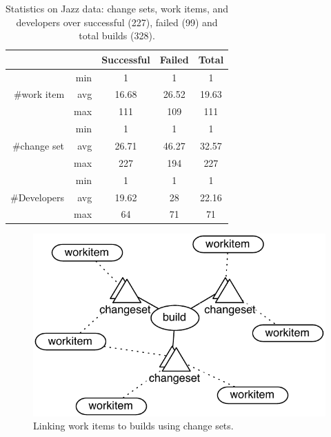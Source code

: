\documentclass[12pt,oneside]{book}
\begin{document}
\begin{table}[t]
\centering
\begin{tabular}{rrccc}
\toprule
& & Successful & Failed & Total\\
\midrule
&min &1&1&1\\
\#work item & avg  & 16.68&26.52&19.63\\
& max & 111&109&111\\
\midrule
& min & 1&1&1\\
\#change set & avg  & 26.71&46.27&32.57\\
& max & 227&194&227\\
\midrule
& min & 1&1&1\\
\#Developers & avg  & 19.62&28&22.16\\
& max &64&71&71\\
\bottomrule
\end{tabular}
\caption{Statistics on Jazz data: change sets, work items, 
and developers over successful (227), failed (99) and total builds (328).}
\label{tab:jazzbuildinfo}
\end{table}

\begin{figure}[b]
\centering
\includegraphics[width=.9\columnwidth]{figures/buildworkitem}
\caption{Linking work items to builds using change sets.}
\label{fig:buildtowork item}
\end{figure}
\end{document}
